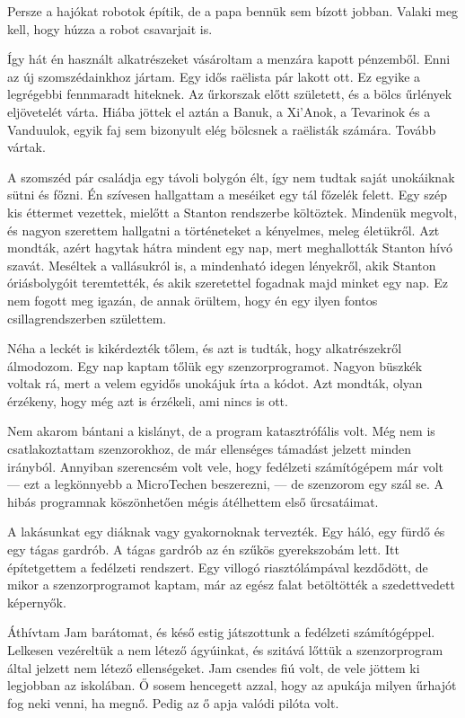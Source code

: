 \documentclass[10pt]{memoir}
\begin{document}
Persze a hajókat robotok építik, de a papa bennük sem bízott jobban. Valaki meg
kell, hogy húzza a robot csavarjait is.

Így hát én használt alkatrészeket vásároltam a menzára kapott pénzemből. Enni
az új szomszédainkhoz jártam. Egy idős raëlista pár lakott ott. Ez egyike a
legrégebbi fennmaradt hiteknek. Az űrkorszak előtt született, és a bölcs
űrlények eljövetelét várta. Hiába jöttek el aztán a Banuk, a Xi’Anok, a
Tevarinok és a Vanduulok, egyik faj sem bizonyult elég bölcsnek a raëlisták
számára. Tovább vártak.

A szomszéd pár családja egy távoli bolygón élt, így nem tudtak saját unokáiknak
sütni és főzni. Én szívesen hallgattam a meséiket egy tál főzelék felett. Egy
szép kis éttermet vezettek, mielőtt a Stanton rendszerbe költöztek. Mindenük
megvolt, és nagyon szerettem hallgatni a történeteket a kényelmes, meleg
életükről. Azt mondták, azért hagytak hátra mindent egy nap, mert meghallották
Stanton hívó szavát. Meséltek a vallásukról is, a mindenható idegen lényekről,
akik Stanton óriásbolygóit teremtették, és akik szeretettel fogadnak majd
minket egy nap. Ez nem fogott meg igazán, de annak örültem, hogy én egy ilyen
fontos csillagrendszerben születtem.

Néha a leckét is kikérdezték tőlem, és azt is tudták, hogy alkatrészekről
álmodozom. Egy nap kaptam tőlük egy szenzorprogramot. Nagyon büszkék voltak rá,
mert a velem egyidős unokájuk írta a kódot. Azt mondták, olyan érzékeny, hogy
még azt is érzékeli, ami nincs is ott.

Nem akarom bántani a kislányt, de a program katasztrófális volt. Még nem is
csatlakoztattam szenzorokhoz, de már ellenséges támadást jelzett minden
irányból. Annyiban szerencsém volt vele, hogy fedélzeti számítógépem már volt
--- ezt a legkönnyebb a MicroTechen beszerezni, --- de szenzorom egy szál se. A
hibás programnak köszönhetően mégis átélhettem első űrcsatáimat.

A lakásunkat egy diáknak vagy gyakornoknak tervezték. Egy háló, egy fürdő és
egy tágas gardrób. A tágas gardrób az én szűkös gyerekszobám lett. Itt
építetgettem a fedélzeti rendszert. Egy villogó riasztólámpával kezdődött, de
mikor a szenzorprogramot kaptam, már az egész falat betöltötték a szedettvedett
képernyők.

Áthívtam Jam barátomat, és késő estig játszottunk a fedélzeti számítógéppel.
Lelkesen vezéreltük a nem létező ágyúinkat, és szitává lőttük a szenzorprogram
által jelzett nem létező ellenségeket. Jam csendes fiú volt, de vele jöttem ki
legjobban az iskolában. Ő sosem hencegett azzal, hogy az apukája milyen űrhajót
fog neki venni, ha megnő. Pedig az ő apja valódi pilóta volt.
\end{document}
